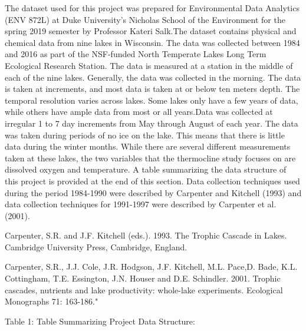 \documentclass[12pt,]{article}
\begin{document}
The dataset used for this project was prepared for Environmental Data
Analytics (ENV 872L) at Duke University's Nicholas School of the
Environment for the spring 2019 semester by Professor Kateri Salk.The
dataset contains physical and chemical data from nine lakes in
Wisconsin. The data was collected between 1984 and 2016 as part of the
NSF-funded North Temperate Lakes Long Term Ecological Research Station.
The data is measured at a station in the middle of each of the nine
lakes. Generally, the data was collected in the morning. The data is
taken at increments, and most data is taken at or below ten meters
depth. The temporal resolution varies across lakes. Some lakes only have
a few years of data, while others have ample data from most or all
years.Data was collected at irregular 1 to 7 day increments from May
through August of each year. The data was taken during periods of no ice
on the lake. This means that there is little data during the winter
months. While there are several different measurements taken at these
lakes, the two variables that the thermocline study focuses on are
dissolved oxygen and temperature. A table summarizing the data structure
of this project is provided at the end of this section. Data collection
techniques used during the period 1984-1990 were described by Carpenter
and Kitchell (1993) and data collection techniques for 1991-1997 were
described by Carpenter et al. (2001).

Carpenter, S.R. and J.F. Kitchell (eds.). 1993. The Trophic Cascade in
Lakes. Cambridge University Press, Cambridge, England.

Carpenter, S.R., J.J. Cole, J.R. Hodgson, J.F. Kitchell, M.L. Pace,D.
Bade, K.L. Cottingham, T.E. Essington, J.N. Houser and D.E. Schindler.
2001. Trophic cascades, nutrients and lake productivity: whole-lake
experiments. Ecological Monographs 71: 163-186."

Table 1: Table Summarizing Project Data Structure:
\end{document}
